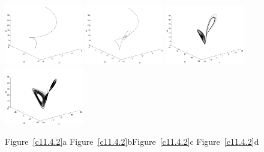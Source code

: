 \documentclass{ximera}
\begin{document}
\begin{computerExercise}
\begin{solution}
\begin{figure}[htb]
                       \centerline{%
                       \includegraphics[width=1.35in]{exfigure/11-4-2a.pdf}
                       \includegraphics[width=1.35in]{exfigure/11-4-2b.pdf}
                       \includegraphics[width=1.35in]{exfigure/11-4-2c.pdf}
                       \includegraphics[width=1.35in]{exfigure/11-4-2d.pdf}}
		\centerline{Figure~\ref{c11.4.2}a\hspace{0.8in}
        	Figure~\ref{c11.4.2}b\hspace{0.8in}Figure~\ref{c11.4.2}c
        	\hspace{0.8in}Figure~\ref{c11.4.2}d}
\end{figure}


\end{solution}
\end{computerExercise}
\end{document}
